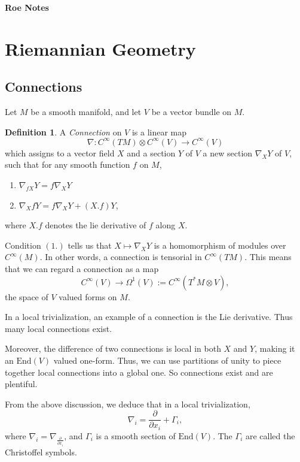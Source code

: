 \documentclass[12pt, reqno]{extarticle}
\theoremstyle{plain}
\theoremstyle{definition}
\newtheorem{definition}{Definition}[section]
\theoremstyle{remark}
\begin{document}
\topmargin=-40pt
\renewcommand{\headrulewidth}{1pt}
\renewcommand{\headsep}{20pt}
\thispagestyle{fancy}

{\Huge \bfseries \noindent Roe Notes}

\tableofcontents

\section{Riemannian Geometry}  

\subsection{Connections}

Let $M$ be a smooth manifold, and let $V$ be a vector bundle on $M$. 

\begin{definition}
    A \textit{Connection} on $V$ is a linear map 
    \[
        \nabla: C^\infty(TM)\otimes C^\infty(V) \to C^\infty(V)
    \]
    which assigns to a vector field $X$ and a section $Y$ of $V$ a new section $\nabla_X Y$ 
    of $V$, such that for any smooth function $f$ on $M$,
    \begin{enumerate}
        \item $\nabla_{fX}Y = f\nabla_X Y$
        \item $\nabla_X{fY} = f\nabla_X Y + (X.f)Y$,
    \end{enumerate}
    where $X.f$ denotes the lie derivative of $f$ along $X$. 
\end{definition}

Condition $(1.)$ tells us that $X \mapsto \nabla_X Y$ is a homomorphism of modules over
$C^\infty(M)$. In other words, a connection is tensorial in $C^\infty(TM)$. This means
that we can regard a connection as a map 
\[
    C^\infty(V) \to \Omega^1(V) := C^\infty(T^*M \otimes V),
\]
the space of $V$ valued forms on $M$.

In a local trivialization, an example of a connection is the Lie derivative. Thus many local connections 
exist.

Moreover, the difference of two connections is local in both $X$ and $Y$, making it an $\text{End}(V)$ valued
one-form. Thus, we can use partitions of unity to piece together local connections into a global one.
So connections exist and are plentiful. 

From the above discussion, we deduce that in a local trivialization,
\[
    \nabla_i = \frac{\partial}{\partial x_i} + \Gamma_i,
\]
where $\nabla_i = \nabla_{\frac{\partial}{\partial x_i}}$, and $\Gamma_i$ is 
a smooth section of $\text{End}(V)$. The $\Gamma_i$ are called the Christoffel symbols. 
\end{document}

